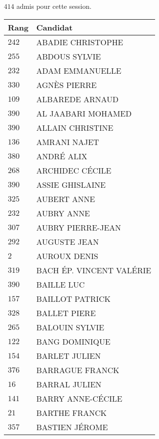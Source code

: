 



  $414$ admis pour cette session.

  \begin{xltabular}{\linewidth}{|l|X|}
    \hline
    \textbf{Rang} & \textbf{Candidat} \\
    \hline
    $242$ & ABADIE CHRISTOPHE \\
    \hline
    $255$ & ABDOUS SYLVIE \\
    \hline
    $232$ & ADAM EMMANUELLE \\
    \hline
    $330$ & AGNÈS PIERRE \\
    \hline
    $109$ & ALBAREDE ARNAUD \\
    \hline
    $390$ & AL JAABARI MOHAMED \\
    \hline
    $390$ & ALLAIN CHRISTINE \\
    \hline
    $136$ & AMRANI NAJET \\
    \hline
    $380$ & ANDRÉ ALIX \\
    \hline
    $268$ & ARCHIDEC CÉCILE \\
    \hline
    $390$ & ASSIE GHISLAINE \\
    \hline
    $325$ & AUBERT ANNE \\
    \hline
    $232$ & AUBRY ANNE \\
    \hline
    $307$ & AUBRY PIERRE-JEAN \\
    \hline
    $292$ & AUGUSTE JEAN \\
    \hline
    $2$ & AUROUX DENIS \\
    \hline
    $319$ & BACH ÉP. VINCENT VALÉRIE \\
    \hline
    $390$ & BAILLE LUC \\
    \hline
    $157$ & BAILLOT PATRICK \\
    \hline
    $328$ & BALLET PIERE \\
    \hline
    $265$ & BALOUIN SYLVIE \\
    \hline
    $122$ & BANG DOMINIQUE \\
    \hline
    $154$ & BARLET JULIEN \\
    \hline
    $376$ & BARRAGUE FRANCK \\
    \hline
    $16$ & BARRAL JULIEN \\
    \hline
    $141$ & BARRY ANNE-CÉCILE \\
    \hline
    $21$ & BARTHE FRANCK \\
    \hline
    $357$ & BASTIEN JÉROME \\

\end{xltabular}
